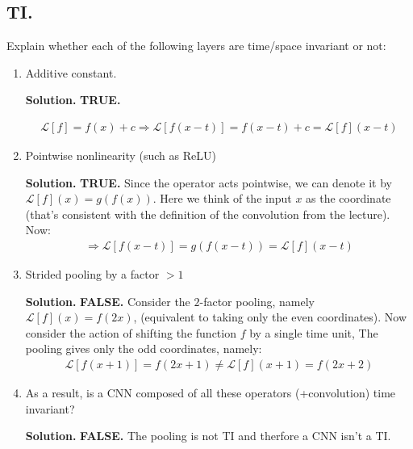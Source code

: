 \documentclass{article}
\begin{document}
\subsection{TI.} Explain whether each of the following layers are time/space invariant or not:
\begin{enumerate}
  \item Additive constant.

    \textbf{Solution.} \textbf{TRUE.} 

\begin{equation*}
    \begin{split}
    \mathcal{L}[f] = f(x) + c \Rightarrow  \mathcal{L}[f(x-t)] = f(x-t) + c =  \mathcal{L}[f](x-t)
    \end{split}
\end{equation*}

  \item Pointwise nonlinearity (such as ReLU)

    \textbf{Solution.} \textbf{TRUE.} Since the operator acts pointwise, we can denote it by $\mathcal{L}[f](x) = g(f(x))$. Here we think of the input $x$ as the coordinate (that's consistent with the definition of the convolution from the lecture). Now:
  \begin{equation*}
    \begin{split}
      \Rightarrow  \mathcal{L}[f(x-t)] = g(f(x-t))  =  \mathcal{L}[f](x-t)
    \end{split}
\end{equation*}
  \item Strided pooling by a factor $ > 1 $


    \textbf{Solution.} \textbf{FALSE.} Consider the $2$-factor pooling, namely $\mathcal{L}[f](x) = f(2x)$, (equivalent to taking only the even coordinates). Now consider the action of shifting the function $f$ by a single time unit, The pooling gives only the odd coordinates, namely:
  \begin{equation*}
    \begin{split}
    \mathcal{L}[f(x+1)] = f(2x+1) \neq \mathcal{L}[f](x+1)= f(2x + 2)
    \end{split}
\end{equation*}
  \item As a result, is a CNN composed of all these operators (+convolution) time invariant? 
   
    
    \textbf{Solution.} \textbf{FALSE.} The pooling is not TI and therfore a CNN isn't a TI. 
\end{enumerate}
\end{document}
